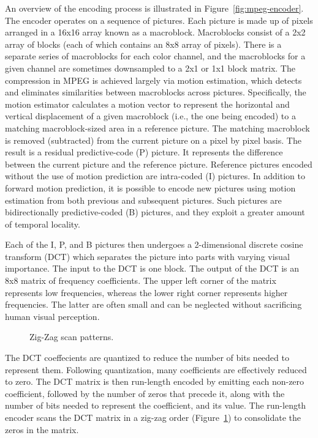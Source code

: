 An overview of the encoding process is illustrated in
Figure~\ref{fig:mpeg-encoder}. The encoder operates on a sequence of
pictures. Each picture is made up of pixels arranged in a 16x16 array
known as a macroblock.  Macroblocks consist of a 2x2 array of blocks
(each of which contains an 8x8 array of pixels).  There is a separate
series of macroblocks for each color channel, and the macroblocks for
a given channel are sometimes downsampled to a 2x1 or 1x1 block
matrix.  The compression in MPEG is achieved largely via motion
estimation, which detects and eliminates similarities between
macroblocks across pictures. Specifically, the motion estimator
calculates a motion vector to represent the horizontal and vertical
displacement of a given macroblock (i.e., the one being encoded) to a
matching macroblock-sized area in a reference picture.  The matching
macroblock is removed (subtracted) from the current picture on a pixel
by pixel basis. The result is a residual predictive-code (P)
picture. It represents the difference between the current picture and
the reference picture. Reference pictures encoded without the use of
motion prediction are intra-coded (I) pictures. In addition to forward
motion prediction, it is possible to encode new pictures using motion
estimation from both previous and subsequent pictures. Such pictures
are bidirectionally predictive-coded (B) pictures, and they exploit a
greater amount of temporal locality.

Each of the I, P, and B pictures then undergoes a 2-dimensional
discrete cosine transform (DCT) which separates the picture into parts
with varying visual importance. The input to the DCT is one block. 
The output of the
DCT is an 8x8 matrix of frequency coefficients. The upper left corner
of the matrix represents low frequencies, whereas the lower right
corner represents higher frequencies. The latter are often small and
can be neglected without sacrificing human visual perception.

\begin{figure}[t]
\begin{center}
\vspace{-12pt}
 \caption{Zig-Zag scan patterns.}
 \label{fig:zigzag}
\end{center}
\end{figure}

The DCT coeffecients are quantized to reduce the number of bits needed
to represent them. Following quantization, many coefficients are
effectively reduced to zero. The DCT matrix is then run-length encoded
by emitting each non-zero coefficient,
followed by the number of zeros that precede it, along with the number
of bits needed to represent the coefficient, and its value. The
run-length encoder scans the DCT matrix in a zig-zag order
(Figure~\ref{fig:zigzag}) to consolidate the zeros in the matrix.


